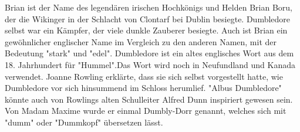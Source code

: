 \documentclass[a4paper, 10pt]{article}
\begin{document}
\vspace{10pt}
\newline
{}  
Brian ist der Name des legendären irischen Hochkönigs und Helden Brian Boru, der die Wikinger in der Schlacht von Clontarf bei Dublin besiegte. Dumbledore selbst war ein Kämpfer, der viele dunkle Zauberer besiegte. Auch ist Brian ein gewöhnlicher englischer Name im Vergleich zu den anderen Namen, mit der Bedeutung "stark" und "edel".
\vspace{10pt}
\newline
{}  
Dumbledore ist ein altes englisches Wort aus dem 18. Jahrhundert für "Hummel".Das Wort wird noch in Neufundland und Kanada verwendet. Joanne Rowling erklärte, dass sie sich selbst vorgestellt hatte, wie Dumbledore vor sich hinsummend im Schloss herumlief.
\vspace{10pt}
\newline
{}  
"Albus Dumbledore" könnte auch von Rowlings alten Schulleiter Alfred Dunn inspiriert gewesen sein.
Von Madam Maxime wurde er einmal Dumbly-Dorr genannt, welches sich mit "dumm" oder "Dummkopf" übersetzen lässt.
\end{document}
